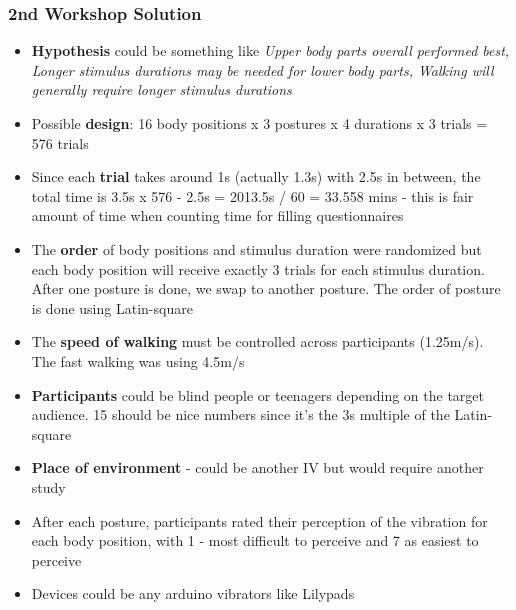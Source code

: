\documentclass{beamer}
\begin{document}
\begin{frame}
	\frametitle{2nd Workshop Solution}
	\footnotesize
	\begin{itemize}
		\item \textbf{Hypothesis} could be something like \em{Upper body parts overall performed best}, \textit{Longer stimulus durations may be needed for lower body parts}, \em{Walking will generally require longer stimulus durations}
		\item Possible \textbf{design}: 16 body positions x 3 postures x 4 durations x 3 trials = 576 trials
		\item Since each \textbf{trial} takes around 1s (actually 1.3s)  with 2.5s in between, the total time is 3.5s x 576 - 2.5s = 2013.5s / 60 = 33.558 mins - this is fair amount of time when counting time for filling questionnaires
		\item The \textbf{order} of body positions and stimulus duration were randomized but each body position will receive exactly 3 trials for each stimulus duration.  After one posture is done, we swap to another posture.  The order of posture is done using Latin-square
		\item The \textbf{speed of walking} must be controlled across participants (1.25m/s).  The fast walking was using 4.5m/s
		\item \textbf{Participants} could be blind people or teenagers depending on the target audience.  15 should be nice numbers since it's the 3s multiple of the Latin-square
		\item \textbf{Place of environment} - could be another IV but would require another study
		\item After each posture, participants rated their perception of the vibration for each body position, with 1 - most difficult to perceive and 7 as easiest to perceive
		\item Devices could be any arduino vibrators like Lilypads
	\end{itemize}
\end{frame}
\end{document}

